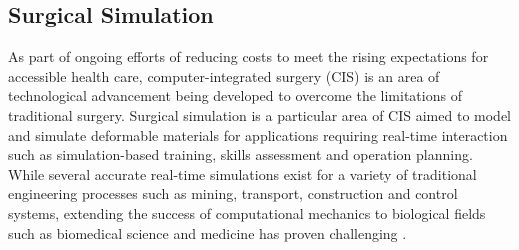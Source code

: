 \begin{comment}


Meshless models for simulating materials

Homogenous Materials:
Brain Deformations: https://www.sciencedirect.com/science/article/pii/S002192900600090X

Meshless Lagrangian explicit dynamics algorithm:
http://isml.ecm.uwa.edu.au/ISML/Publication/pdfs/2010hortonmillerIJfNMiBEmeshless.pdf

Volume rendering consists of techniques for 3D surface construction.

Non linear methods:
Moving least squared: http://www.cs.utah.edu/~csilva/courses/cpsc7960/pdf/lancaster-salkauskas-mls.pdf

Total Lagrangian explicit dynamics finite element algorithm for computing soft tissue deformation, 2006

Patient-specific model of brain deformation: Application to medical image registration, 2007

Open-source platforms for navigated image-guided interventions, 2016

(Hyper)-graphical models in biomedical image analysis, 2016


Camera tracking objects is bad, handling occlusions is problematic


Total Lagrangian explicit dynamics finite element algorithm for computing soft tissue deformation \cite{Miller2007}

Patient-specific model of brain deformation: Application to medical image registration
\cite{Wittek2007}

A meshless Total Lagrangian explicit dynamics algorithm for surgical simulation
\cite{Horton2010}

\end{comment}

\subsection{Surgical Simulation}

As part of ongoing efforts of reducing costs to meet the rising expectations for accessible health care, computer-integrated surgery (CIS) is an area of technological advancement being developed to overcome the limitations of traditional surgery. Surgical simulation is a particular area of CIS aimed to model and simulate deformable materials for applications requiring real-time interaction such as simulation-based training, skills assessment and operation planning.\cite{Miller2007} While several accurate real-time simulations exist for a variety of traditional engineering processes such as mining, transport, construction and control systems, extending the success of computational mechanics to biological fields such as biomedical science and medicine has proven challenging \cite{TinsleyOden2003}.

